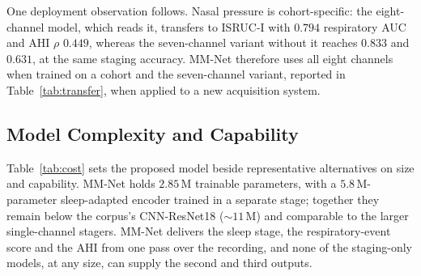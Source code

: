 \documentclass{ieeeaccess}
\begin{document}
One deployment observation follows. Nasal pressure is cohort-specific: the eight-channel
model, which reads it, transfers to ISRUC-I with $0.794$ respiratory AUC and AHI $\rho$ $0.449$,
whereas the seven-channel variant without it reaches $0.833$ and $0.631$, at the same staging
accuracy. MM-Net therefore uses all eight channels when trained on a cohort and the
seven-channel variant, reported in Table~\ref{tab:transfer}, when applied to a new acquisition
system.

\begin{table}[t]
\caption{MM-Net trained on all $99$ iSLEEPS patients and applied without retraining
(three-seed, seven-channel variant without nasal pressure; AHI scale $k$ from iSLEEPS). AHI is
not reported for the healthy ISRUC-III subjects.}
\label{tab:transfer}
\centering
\small
\setlength{\tabcolsep}{3pt}
\end{table}

\subsection{Model Complexity and Capability}
Table~\ref{tab:cost} sets the proposed model beside representative alternatives on size and
capability. MM-Net holds $2.85$\,M trainable parameters, with a $5.8$\,M-parameter
sleep-adapted encoder trained in a separate stage; together they remain below the corpus's
CNN-ResNet18 ($\sim$$11$\,M) and comparable to the larger single-channel stagers. MM-Net
delivers the sleep stage, the respiratory-event score and the AHI from one pass over the
recording, and none of the staging-only models, at any size, can supply the second and third
outputs.
\end{document}
